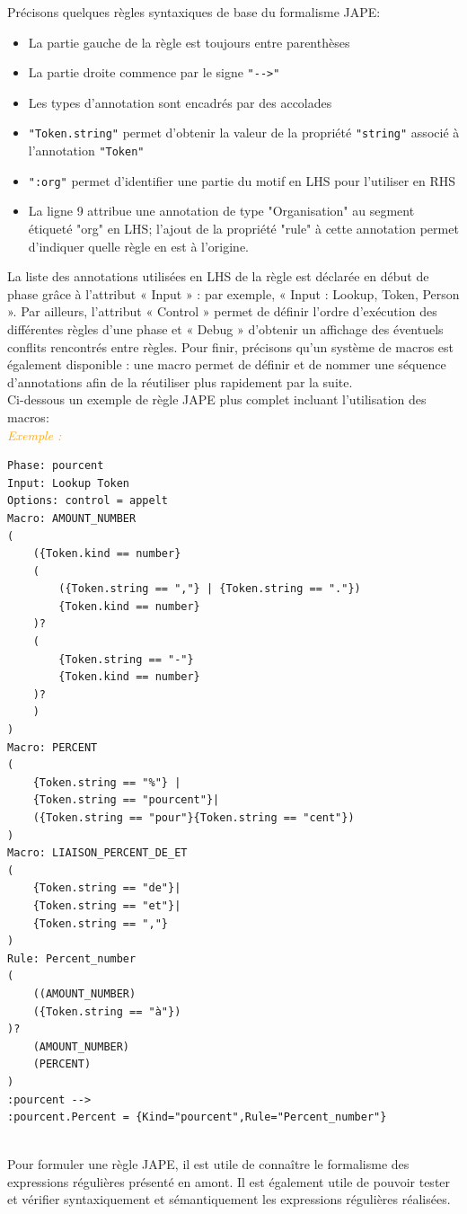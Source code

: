 \documentclass[a4paper, 11pt]{report}
\newenvironment{exemple}
    {
    \textit{\textcolor{orange}{
    Exemple : \\}}
    }
    {~\\
    }
\begin{document}
Précisons quelques règles syntaxiques de base du formalisme JAPE:
\begin{itemize}
	\item La partie gauche de la règle est toujours entre parenthèses
	\item La partie droite commence par le signe \verb|"-->"|
	\item Les types d'annotation sont encadrés par des accolades
	\item \verb|"Token.string"| permet d'obtenir la valeur de la propriété \verb|"string"| associé à l'annotation \verb|"Token"|
	\item \verb|":org"| permet d'identifier une partie du motif en LHS pour l'utiliser en RHS
	\item La ligne 9 attribue une annotation de type "Organisation" au segment étiqueté "org" en LHS; l'ajout de la propriété "rule" à cette annotation permet d'indiquer quelle règle en est à l'origine.
\end{itemize}
La liste des annotations utilisées en LHS de la règle est déclarée en début de phase grâce à l'attribut « Input » : par exemple, « Input : Lookup, Token, Person ». Par ailleurs, l'attribut « Control » permet de définir l'ordre d'exécution des différentes règles d'une phase et « Debug »
d'obtenir un affichage des éventuels conflits rencontrés entre règles.
Pour finir, précisons qu'un système de macros est également disponible : une macro permet
de définir et de nommer une séquence d'annotations afin de la réutiliser plus rapidement par la suite.\cite{SL10}\\
Ci-dessous un exemple de règle JAPE plus complet incluant l'utilisation des macros:\\
\begin{exemple}
\begin{verbatim}
Phase: pourcent
Input: Lookup Token
Options: control = appelt
Macro: AMOUNT_NUMBER
(
	({Token.kind == number}
	(
		({Token.string == ","} | {Token.string == "."})
		{Token.kind == number}
	)?
	(
		{Token.string == "-"}
		{Token.kind == number}
	)?
	)
)
Macro: PERCENT
(
	{Token.string == "%"} |
	{Token.string == "pourcent"}|
	({Token.string == "pour"}{Token.string == "cent"})
)
Macro: LIAISON_PERCENT_DE_ET
(
	{Token.string == "de"}|
	{Token.string == "et"}|
	{Token.string == ","}
)
Rule: Percent_number
(
	((AMOUNT_NUMBER)
	({Token.string == "à"})
)?
	(AMOUNT_NUMBER)
	(PERCENT)
)
:pourcent -->
:pourcent.Percent = {Kind="pourcent",Rule="Percent_number"}
\end{verbatim}
\end{exemple}
Pour formuler une règle JAPE, il est utile de connaître le formalisme des expressions régulières présenté en amont. Il est également utile de pouvoir tester et vérifier syntaxiquement et sémantiquement les expressions régulières réalisées.
\newpage
\end{document}
